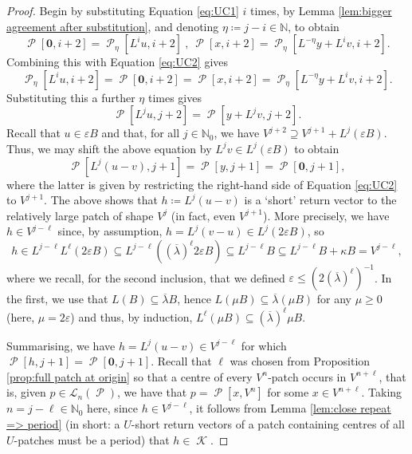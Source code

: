 \documentclass[10pt,a4paper]{amsart}
\newcommand{\N}{\mathbb N}
\DeclareMathOperator{\cK}{\mathcal{K}}
\DeclareMathOperator{\cP}{\mathcal{P}}
\renewcommand{\epsilon}{\varepsilon}
\newcommand{\lang}{\mathscr{L}}
\begin{document}
\begin{proof}
Begin by substituting Equation \ref{eq:UC1} \(i\) times, by Lemma \ref{lem:bigger agreement after substitution}, and denoting \(\eta \coloneqq j-i \in \N\), to obtain
\begin{equation}\label{eq:UC4}
\cP[\mathbf{0},i+2] = \cP_\eta[L^i u,i+2]\ , \ \cP[x,i+2] = \cP_\eta[L^{-\eta} y + L^i v,i+2] .
\end{equation}
Combining this with Equation \ref{eq:UC2} gives
\begin{equation}\label{eq:UC5}
\cP_\eta[L^i u,i+2] = \cP[\mathbf{0},i+2] = \cP[x,i+2] = \cP_\eta[L^{-\eta} y + L^i v,i+2] .
\end{equation}
Substituting this a further \(\eta\) times gives
\[
\cP[L^j u,j+2] = \cP[y + L^j v,j+2] .
\]
Recall that \(u \in \epsilon B\) and that, for all \(j \in \N_0\), we have \(V^{j+2} \supseteq V^{j+1} + L^j(\epsilon B)\). Thus, we may shift the above equation by \(L^j v \in L^j(\epsilon B)\) to obtain
\begin{equation}
\cP[L^j(u-v),j+1] = \cP[y,j+1] = \cP[\mathbf{0},j+1] ,
\end{equation}
where the latter is given by restricting the right-hand side of Equation \ref{eq:UC2} to \(V^{j+1}\). The above shows that \(h \coloneqq L^j(u-v)\) is a `short' return vector to the relatively large patch of shape \(V^j\) (in fact, even \(V^{j+1}\)). More precisely, we have \(h \in V^{j-\ell}\) since, by assumption, \(h = L^j(v - u) \in L^j(2\epsilon B)\), so
\[
h \in L^{j-\ell}L^\ell(2\epsilon B) \subseteq L^{j-\ell}((\overline{\lambda})^\ell 2\epsilon B) \subseteq L^{j-\ell} B \subseteq L^{j-\ell} B + \kappa B = V^{j-\ell} ,
\]
where we recall, for the second inclusion, that we defined \(\epsilon \leq (2(\overline{\lambda})^\ell)^{-1}\). In the first, we use that \(L(B) \subseteq \overline{\lambda}B\), hence \(L(\mu B) \subseteq \overline{\lambda}(\mu B)\) for any \(\mu \geq 0\) (here, \(\mu = 2\epsilon\)) and thus, by induction, \(L^\ell(\mu B) \subseteq (\overline{\lambda})^\ell \mu B\).

Summarising, we have \(h = L^j(u-v) \in V^{j-\ell}\) for which \(\cP[h,j+1] = \cP[\mathbf{0},j+1]\). Recall that \(\ell\) was chosen from Proposition \ref{prop:full patch at origin} so that a centre of every \(V^n\)-patch occurs in \(V^{n+\ell}\), that is, given \(p \in \lang_n(\cP)\), we have that \(p = \cP[x,V^n]\) for some \(x \in V^{n+\ell}\). Taking \(n = j-\ell \in \N_0\) here, since \(h \in V^{j-\ell}\), it follows from Lemma \ref{lem:close repeat => period} (in short: a \(U\)-short return vectors of a patch containing centres of all \(U\)-patches must be a period) that \(h \in \cK\).


\end{proof}
\end{document}

